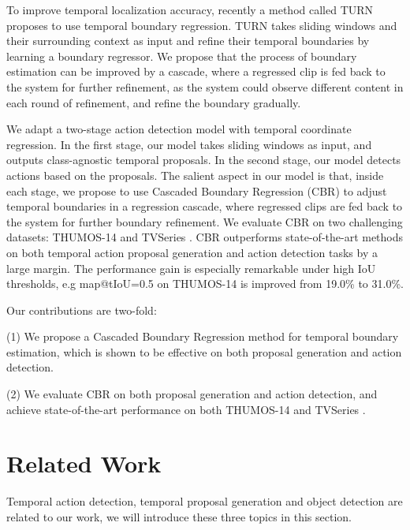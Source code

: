 \documentclass{bmvc2k}
\begin{document}
To improve temporal localization accuracy, recently a method called TURN \cite{gao2017turn} proposes to use temporal boundary regression. TURN takes sliding windows and their surrounding context as input and refine their temporal boundaries by learning a boundary regressor. We propose that the process of boundary estimation can be improved by a cascade, where a regressed clip is fed back to the system for further refinement, as the system could observe different content in each round of refinement, and refine the boundary gradually.


We adapt a two-stage action detection model with temporal coordinate regression. In the first stage, our model takes sliding windows as input, and outputs class-agnostic temporal proposals. In the second stage, our model detects actions based on the proposals. The salient aspect in our model is that, inside each stage, we propose to use Cascaded Boundary Regression (CBR) to adjust temporal boundaries in a regression cascade, where regressed clips are fed back to the system for further boundary refinement. We evaluate CBR on two challenging datasets: THUMOS-14 and TVSeries \cite{de2016online}. CBR outperforms state-of-the-art methods on both temporal action proposal generation and action detection tasks by a large margin. The performance gain is especially remarkable under high IoU thresholds, e.g map@tIoU=0.5 on THUMOS-14 is improved from 19.0\% to 31.0\%.



Our contributions are two-fold:

(1) We propose a Cascaded Boundary Regression method for temporal boundary estimation, which is shown to be effective on both proposal generation and action detection.

(2) We evaluate CBR on both proposal generation and action detection, and achieve state-of-the-art performance on both THUMOS-14 and TVSeries \cite{de2016online}.

\section{Related Work}
Temporal action detection, temporal proposal generation and object detection are related to our work, we will introduce these three topics in this section.
\end{document}
